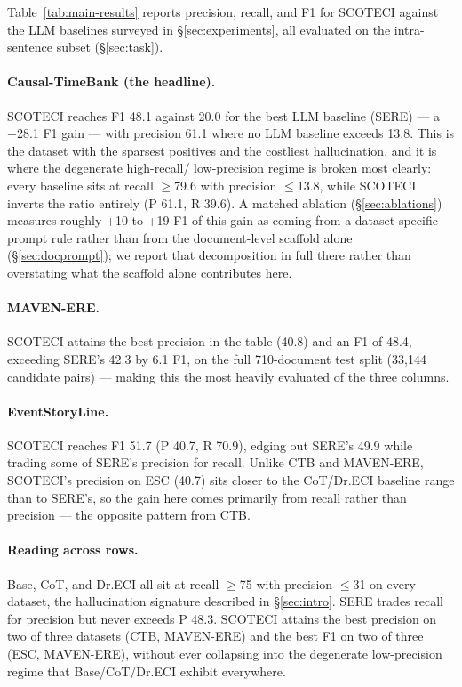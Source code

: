 \documentclass[11pt]{article}
\newcommand{\method}{SCOTECI}
\begin{document}
Table~\ref{tab:main-results} reports precision, recall, and F1 for \method{}
against the LLM baselines surveyed in \S\ref{sec:experiments}, all evaluated on the
intra-sentence subset (\S\ref{sec:task}).

\paragraph{Causal-TimeBank (the headline).} \method{} reaches F1 48.1 against 20.0
for the best LLM baseline (SERE) --- a +28.1 F1 gain --- with precision 61.1 where
no LLM baseline exceeds 13.8. This is the dataset with the sparsest positives and
the costliest hallucination, and it is where the degenerate high-recall/
low-precision regime is broken most clearly: every baseline sits at recall
$\ge$79.6 with precision $\le$13.8, while \method{} inverts the ratio entirely
(P 61.1, R 39.6). A matched ablation (\S\ref{sec:ablations}) measures roughly
+10 to +19 F1 of this gain as coming from a dataset-specific prompt rule rather
than from the document-level scaffold alone (\S\ref{sec:docprompt}); we report
that decomposition in full there rather than overstating what the scaffold alone
contributes here.

\paragraph{MAVEN-ERE.} \method{} attains the best precision in the table (40.8) and
an F1 of 48.4, exceeding SERE's 42.3 by 6.1 F1, on the full 710-document test split
(33{,}144 candidate pairs) --- making this the most heavily evaluated of the three
columns.

\paragraph{EventStoryLine.} \method{} reaches F1 51.7 (P 40.7, R 70.9), edging out
SERE's 49.9 while trading some of SERE's precision for recall. Unlike CTB and
MAVEN-ERE, \method{}'s precision on ESC (40.7) sits closer to the CoT/Dr.ECI
baseline range than to SERE's, so the gain here comes primarily from recall rather
than precision --- the opposite pattern from CTB.

\paragraph{Reading across rows.} Base, CoT, and Dr.ECI all sit at recall $\ge$75
with precision $\le$31 on every dataset, the hallucination signature described in
\S\ref{sec:intro}. SERE trades recall for precision but never exceeds P 48.3.
\method{} attains the best precision on two of three datasets (CTB, MAVEN-ERE) and
the best F1 on two of three (ESC, MAVEN-ERE), without ever collapsing into the
degenerate low-precision regime that Base/CoT/Dr.ECI exhibit everywhere.
\end{document}
